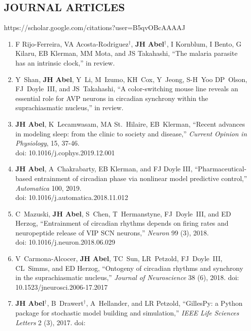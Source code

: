 \documentclass[line,10pt]{res}
\begin{document}
\begin{resume}
\section{\bf JOURNAL ARTICLES}
\vspace{0.5em}
https://scholar.google.com/citations?user=B5qvOBcAAAAJ
\vspace{1em}
\begin{enumerate}
    \setlength\itemsep{0.8em}
    \item F Rijo-Ferreira, VA Acosta-Rodriguez$^\dagger$, \textbf{JH Abel}$^\dagger$, I Kornblum, I Bento, G Kilaru, EB Klerman, MM Mota, and JS Takahashi, ``The malaria parasite has an intrinsic clock,'' in review.
    \item Y~Shan, \textbf{JH Abel}, Y~Li, M~Izumo, KH~Cox, Y~Jeong, {S-H}~Yoo DP~Olson, FJ~Doyle~III, and JS~Takahashi, ``A color-switching mouse line reveals an essential role for AVP neurons in circadian synchrony within the suprachiasmatic nucleus,'' in review.
        \item \textbf{JH Abel}, K~Lecamwasam, MA St.\ Hilaire, EB~Klerman, ``Recent advances in modeling sleep: from the clinic to society and disease,'' 
    \textit{Current Opinion in Physiology}, 
    15, 37-46. \\doi: 10.1016/j.cophys.2019.12.001
    \item \textbf{JH Abel}, A~Chakrabarty, EB Klerman, and FJ Doyle III, ``Pharmaceutical-based entrainment of circadian phase via nonlinear model predictive
	    control,'' \textit{Automatica} 100, 2019. \\doi: %
    10.1016/j.automatica.2018.11.012%
    \item C~Mazuski, \textbf{JH Abel}, S~Chen, T~Hermanstyne, FJ~Doyle~III, and ED Herzog, ``Entrainment of circadian rhythms depends on firing rates and neuropeptide release of VIP SCN neurons,'' \textit{Neuron} 99 (3), 2018.\\ doi: %
    10.1016/j.neuron.2018.06.029%
    \item V~Carmona-Alcocer, \textbf{JH Abel}, TC~Sun, LR~Petzold, FJ~Doyle~III, CL~Simms, and ED Herzog, ``Ontogeny of circadian rhythms and synchrony in the suprachiasmatic nucleus,'' \textit{Journal of Neuroscience} 38 (6), 2018. doi: %
    10.1523/jneurosci.2006-17.2017%
    \item \textbf{JH Abel}$^\dagger$, B~Drawert$^\dagger$, A~Hellander, and LR Petzold, ``GillesPy: a Python package for stochastic model building and simulation,'' \textit{IEEE Life Sciences Letters} 2 (3), 2017. doi: %

\end{enumerate}
\end{resume}
\end{document}
